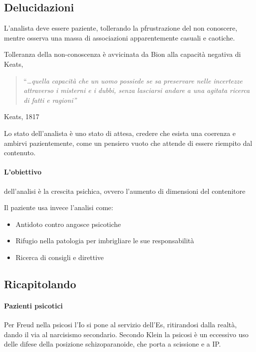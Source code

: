 \documentclass[12pt, a4paper]{article}
\begin{document}
\subsection{Delucidazioni}

L'analista deve essere paziente, tollerando la pfrustrazione del non conoscere, mentre osserva una massa di associazioni apparentemente casuali e caotiche.

Tolleranza della non-conoscenza \`e avvicinata da Bion alla capacit\`a negativa di Keats, 
\begin{quote}``\emph{\ldots quella capacit\`a che un uomo possiede se sa preservare nelle incertezze attraverso i misterni e i dubbi, senza lasciarsi andare a una agitata ricerca di fatti e ragioni''}
\end{quote}
\begin{flushright}
    Keats, 1817
\end{flushright}

Lo stato dell'analista \`e uno stato di attesa, credere che esista una coerenza e ambirvi pazientemente, come un pensiero vuoto che attende di essere riempito dal contenuto.

\paragraph{L'obiettivo} dell'analisi \`e la crescita psichica, ovvero l'aumento di dimensioni del contenitore

Il paziente usa invece l'analisi come:
\begin{itemize}
    \item Antidoto contro angosce psicotiche
    \item Rifugio nella patologia per imbrigliare le sue responsabilit\`a
    \item Ricerca di consigli e direttive
\end{itemize}

\subsection{Ricapitolando}

\paragraph{Pazienti psicotici} Per Freud nella psicosi l'Io si pone al servizio dell'Es, ritirandosi dalla realt\`a, dando il via al narcisismo secondario.  
Secondo Klein la psicosi \`e un eccessivo uso delle difese della posizione schizoparanoide, che porta a scissione e a IP.
\end{document}
